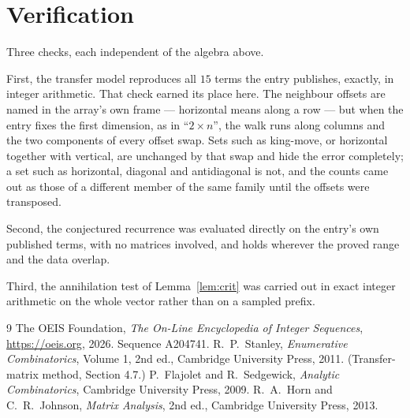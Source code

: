 \documentclass[11pt,a4paper]{article}
\theoremstyle{plain}
\theoremstyle{definition}
\begin{document}
\section{Verification}

Three checks, each independent of the algebra above.

First, the transfer model reproduces all $15$ terms the entry publishes, exactly, in
integer arithmetic. That check earned its place here. The neighbour offsets are named in the
array's own frame --- horizontal means along a row --- but when the entry fixes the first
dimension, as in ``$2\times n$'', the walk runs along columns and the two components of every
offset swap. Sets such as king-move, or horizontal together with vertical, are unchanged by
that swap and hide the error completely; a set such as horizontal, diagonal and antidiagonal
is not, and the counts came out as those of a different member of the same family until the
offsets were transposed.

Second, the conjectured recurrence was evaluated directly on the entry's own published terms,
with no matrices involved, and holds wherever the proved range and the data overlap.

Third, the annihilation test of Lemma~\ref{lem:crit} was carried out in exact integer
arithmetic on the whole vector rather than on a sampled prefix.

\begin{thebibliography}{9}
 The OEIS Foundation, \emph{The On-Line Encyclopedia of Integer
Sequences}, \url{https://oeis.org}, 2026. Sequence A204741.
 R.~P.~Stanley, \emph{Enumerative Combinatorics}, Volume 1, 2nd ed.,
Cambridge University Press, 2011. (Transfer-matrix method, Section 4.7.)
 P.~Flajolet and R.~Sedgewick, \emph{Analytic Combinatorics}, Cambridge
University Press, 2009.
 R.~A.~Horn and C.~R.~Johnson, \emph{Matrix Analysis}, 2nd ed., Cambridge
University Press, 2013.
\end{thebibliography}
\end{document}
